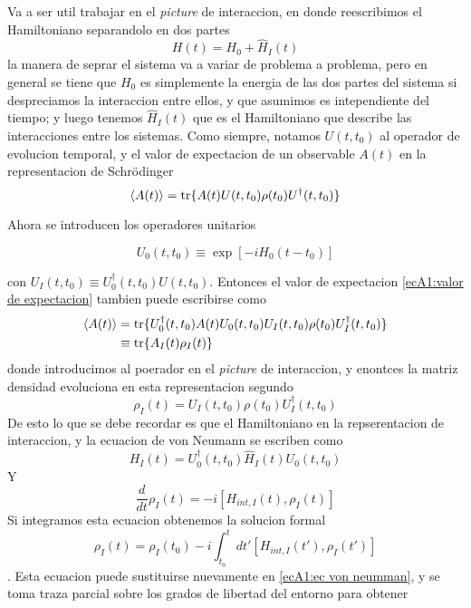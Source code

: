 Va a ser util trabajar en el \textit{picture} de interaccion, en donde reescribimos el Hamiltoniano separandolo en dos partes
\begin{equation}
    H(t)=H_0+\hat H_I(t)
\end{equation}
la manera de seprar el sistema va a variar de problema a problema, pero en general se tiene que $H_0$ es simplemente la energia de las dos partes del sistema si despreciamos la interaccion entre ellos, y que asumimos es intependiente del tiempo; y luego tenemos $\hat H_I(t)$ que es el Hamiltoniano que describe las interacciones entre los sistemas. Como siempre, notamos $U(t,t_0)$ al operador de evolucion temporal, y el valor de expectacion de un observable $A(t)$ en la representacion de Schrödinger
\begin{equation}
    \langle A(t) \rangle = \tr \{ A(t)U(t,t_0) \rho(t_0)U^\dagger(t,t_0) \}
    \label{ecA1:valor de expectacion}
\end{equation}

Ahora se introducen los operadores unitarios

\begin{equation}
    U_0(t,t_0)\equiv\exp [ -i H_0(t-t_0)]
\end{equation}

con $U_I(t,t_0)\equiv U_0^\dagger(t,t_0)U(t,t_0)$. Entonces el valor de expectacion \ref{ecA1:valor de expectacion} tambien puede escribirse como
\begin{equation}
    \begin{aligned}
    \langle A(t) \rangle &= \tr \{ U_0^\dagger(t,t_0)A(t)U_0(t,t_0)U_I(t,t_0) \rho(t_0)U_I^\dagger(t,t_0) \} \\
    & \equiv \tr \{A_I(t)\rho_I(t) \}
    \end{aligned}
    \label{ecA1:valor de expectacion interaccion}
\end{equation}
donde introducimos al poerador en el \textit{picture} de interaccion, y enontces la matriz densidad evoluciona en esta representacion segundo
\begin{equation}
    \rho_I(t)=U_I(t,t_0)\rho(t_0)U^\dagger_I(t,t_0)
\end{equation}
De esto lo que se debe recordar es que el Hamiltoniano en la repserentacion de interaccion, y la ecuacion de von Neumann se escriben como
\begin{equation}
    H_I(t)=U_0^\dagger(t,t_0)\hat H_I(t)U_0(t,t_0)
\end{equation}
Y
\begin{equation}
    \frac{d}{dt}\rho_I(t)=-i[H_{int,I}(t),\rho_I(t)]
    \label{ecA1:ec von neumman}
\end{equation}
Si integramos esta ecuacion obtenemos la solucion formal
\begin{equation}
    \rho_I(t)=\rho_I(t_0)-i\int_{t_0}^{t}dt' [H_{int,I}(t'),\rho_I(t')]
    \label{ecA1:ec maestra integrodiferencial}
\end{equation}
. Esta ecuacion puede sustituirse nuevamente en \ref{ecA1:ec von neumman}, y se toma traza parcial sobre los grados de libertad del entorno para obtener


